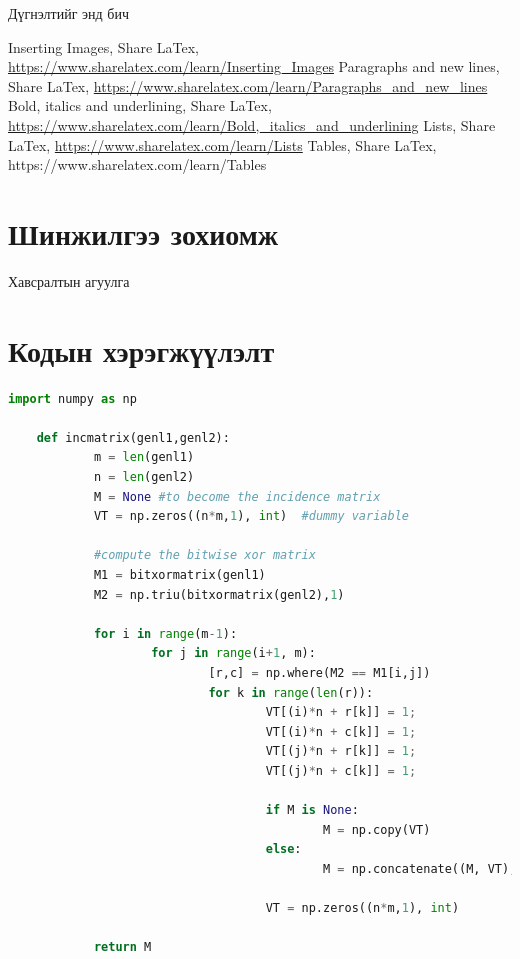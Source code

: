\documentclass[12pt,A4]{report}
\begin{document}
Дүгнэлтийг энд бич



\singlespace
{}
\begin{thebibliography}{}
	Inserting Images, Share LaTex, \url{https://www.sharelatex.com/learn/Inserting_Images}
	Paragraphs and new lines,  Share LaTex, \url{https://www.sharelatex.com/learn/Paragraphs_and_new_lines}
	Bold, italics and underlining, Share LaTex, \url{https://www.sharelatex.com/learn/Bold,_italics_and_underlining}
	Lists, Share LaTex, \url{https://www.sharelatex.com/learn/Lists}
	Tables, Share LaTex, https://www.sharelatex.com/learn/Tables
\end{thebibliography}


\appendix
{}

\chapter{Шинжилгээ зохиомж}
Хавсралтын агуулга

\chapter{Кодын хэрэгжүүлэлт}

\begin{lstlisting}[language=Python]
	import numpy as np
	 
	def incmatrix(genl1,genl2):
			m = len(genl1)
			n = len(genl2)
			M = None #to become the incidence matrix
			VT = np.zeros((n*m,1), int)  #dummy variable
	 
			#compute the bitwise xor matrix
			M1 = bitxormatrix(genl1)
			M2 = np.triu(bitxormatrix(genl2),1) 
	 
			for i in range(m-1):
					for j in range(i+1, m):
							[r,c] = np.where(M2 == M1[i,j])
							for k in range(len(r)):
									VT[(i)*n + r[k]] = 1;
									VT[(i)*n + c[k]] = 1;
									VT[(j)*n + r[k]] = 1;
									VT[(j)*n + c[k]] = 1;
	 
									if M is None:
											M = np.copy(VT)
									else:
											M = np.concatenate((M, VT), 1)
	 
									VT = np.zeros((n*m,1), int)
	 
			return M
	\end{lstlisting}
\end{document}
